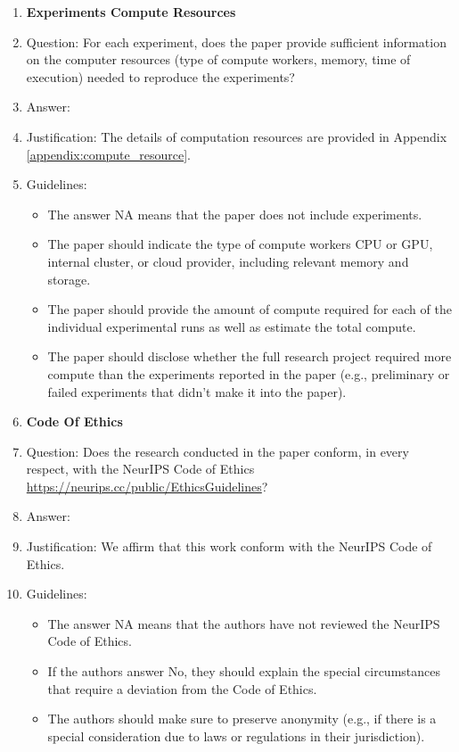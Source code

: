 \documentclass{article}
\theoremstyle{plain}
\theoremstyle{definition}
\theoremstyle{remark}
\begin{document}
\begin{enumerate}
\item {\bf Experiments Compute Resources}
    \item[] Question: For each experiment, does the paper provide sufficient information on the computer resources (type of compute workers, memory, time of execution) needed to reproduce the experiments?
    \item[] Answer: \answerYes{} %
    \item[] Justification: The details of computation resources are provided in Appendix \ref{appendix:compute_resource}. 
    \item[] Guidelines:
    \begin{itemize}
        \item The answer NA means that the paper does not include experiments.
        \item The paper should indicate the type of compute workers CPU or GPU, internal cluster, or cloud provider, including relevant memory and storage.
        \item The paper should provide the amount of compute required for each of the individual experimental runs as well as estimate the total compute. 
        \item The paper should disclose whether the full research project required more compute than the experiments reported in the paper (e.g., preliminary or failed experiments that didn't make it into the paper). 
    \end{itemize}
    
\item {\bf Code Of Ethics}
    \item[] Question: Does the research conducted in the paper conform, in every respect, with the NeurIPS Code of Ethics \url{https://neurips.cc/public/EthicsGuidelines}?
    \item[] Answer: \answerYes{} %
    \item[] Justification: We affirm that this work conform with the NeurIPS Code of Ethics. 
    \item[] Guidelines:
    \begin{itemize}
        \item The answer NA means that the authors have not reviewed the NeurIPS Code of Ethics.
        \item If the authors answer No, they should explain the special circumstances that require a deviation from the Code of Ethics.
        \item The authors should make sure to preserve anonymity (e.g., if there is a special consideration due to laws or regulations in their jurisdiction).
    \end{itemize}



\end{enumerate}
\end{document}
